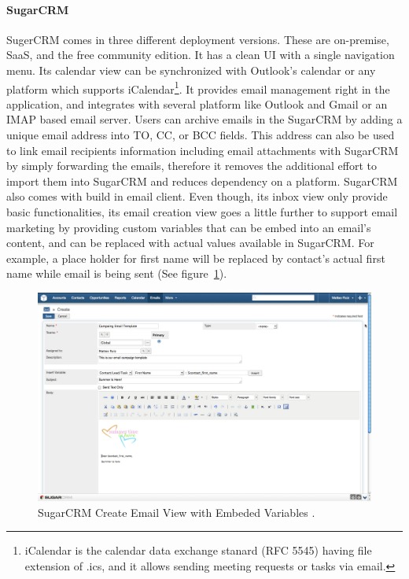 \paragraph{SugarCRM}
SugerCRM comes in three different deployment versions. These are on-premise, \ac{SaaS}, and the free community edition. It has a clean \ac{UI} with a single navigation menu. Its calendar view can be synchronized with Outlook's calendar or any platform which supports iCalendar\footnote{iCalendar is the calendar data exchange stanard (RFC 5545) having file extension of .ics, and it allows sending meeting requests or tasks via email.}. It provides email management right in the application, and integrates with several platform like Outlook and Gmail or an \ac{IMAP} based email server. Users can archive emails in the SugarCRM by adding a unique email address into TO, \ac{CC}, or \ac{BCC} fields. This address can also be used to link email recipients information including email attachments with SugarCRM by simply forwarding the emails, therefore it removes the additional effort to import them into SugarCRM and reduces dependency on a platform. SugarCRM also comes with build in email client. Even though, its inbox view only provide basic functionalities, its email creation view goes a little further to support email marketing by providing custom variables that can be embed into an email's content, and can be replaced with actual values available in SugarCRM. For example, a place holder for first name will be replaced by contact's actual first name while email is being sent (See figure~\ref{fig:SugarCRM-Create_Email}). 
\vspace{1cm}

\begin{figure}[htbp]
	\includegraphics[width=1.00\textwidth]{imgs/SugarCRM-Create_Email.png}
	\caption[SugarCRM Create Email View with Embeded Variables]{SugarCRM Create Email View with Embeded Variables \citep{SugarCRMInc.2013}.}
	\label{fig:SugarCRM-Create_Email}
\end{figure}


